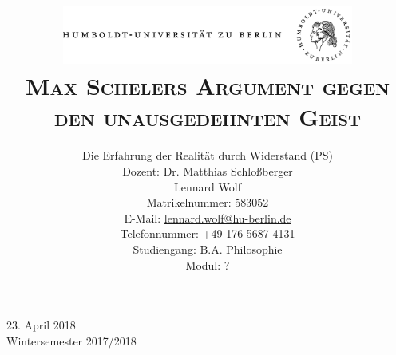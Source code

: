 \documentclass[a4paper, 12pt]{article}
\date{\vspace{-3ex}}
\begin{document}
\title{\vspace{5ex}
	\includegraphics*[bb=0 0 720 200, width=0.72\textwidth]{ErstesSem/images/hu_logo.png}\\
	\vspace{30pt}
	\scshape\LARGE{Max Schelers Argument gegen den unausgedehnten Geist}\\\vspace{20pt}}
	


\author{Die Erfahrung der Realität durch Widerstand (PS)\\
	\vspace{7pt}
          Dozent: Dr. Matthias Schloßberger\\\vspace{4pt}Lennard Wolf\\
        \small{Matrikelnummer: 583052}\\
        \small{E-Mail: \href{mailto:lennard.wolf@hu-berlin.de}{lennard.wolf@hu-berlin.de}}\\
        \small{Telefonnummer: +49 176 5687 4131}\\
        \small{Studiengang: B.A. Philosophie}\\
        \small{Modul: ?}}

\maketitle

\vspace{\fill}

\begin{minipage}[]{0.92\textwidth}
    \centering
    \onehalfspacing
    \large   
    23. April 2018\\
    Wintersemester 2017/2018

    \vspace{-20mm} 
\end{minipage}%
\thispagestyle{empty}
\newpage
\setcounter{page}{1}
\end{document}
